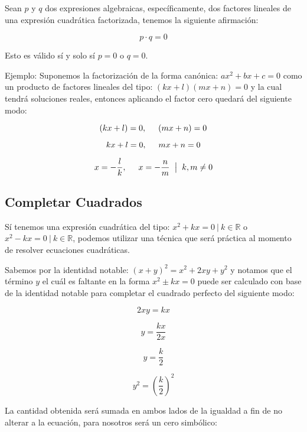 \documentclass[letterpaper, 10pt, oneside]{book}
\begin{document}
	\begin{tcolorbox}[title=Propiedad del Factor Cero]
		Sean $p$ y $q$ dos expresiones algebraicas, específicamente, dos factores lineales de una expresión cuadrática factorizada, tenemos la siguiente afirmación: 
		
		$$p\cdot q = 0$$
		
		Esto es válido sí y solo sí $p=0$ o $q=0$.
	\end{tcolorbox}
	
	\vspace{5mm}
	
	Ejemplo: Suponemos la factorización de la forma canónica: $ax^2+bx+c=0$ como un producto de factores lineales del tipo: $(kx+l)(mx+n)=0$ y la cual tendrá soluciones reales, entonces aplicando el factor cero quedará del siguiente modo:
	
	$$(kx+l)=0, \hspace{5mm} (mx+n)=0$$
	
	$$kx+l=0, \hspace{5mm} mx+n=0$$
	
	$$x=-\frac{l}{k}, \hspace{5mm} x=-\frac{n}{m} \hspace{2mm} \big| \hspace{2mm}  k, m \neq 0$$
	
	\subsection{Completar Cuadrados}
	
	Sí tenemos una expresión cuadrática del tipo: $x^2+kx=0 \ | \ k \in \mathbb{R}$ o $x^2-kx=0 \ | \ k \in \mathbb{R}$, podemos utilizar una técnica que será práctica al momento de resolver ecuaciones cuadráticas.\newline
	
	Sabemos por la identidad notable: $(x+y)^2=x^2+2xy+y^2$ y notamos que el término $y$ el cuál es faltante en la forma $x^2\pm kx=0$ puede ser calculado con base de la identidad notable para completar el cuadrado perfecto del siguiente modo:\newline
	
	$$2xy = kx$$
	
	$$y=\frac{kx}{2x}$$
	
	$$y=\frac{k}{2}$$
	
	$$y^2=\left(\frac{k}{2}\right)^2$$\newline
	
	La cantidad obtenida será sumada en ambos lados de la igualdad a fin de no alterar a la ecuación, para nosotros será un cero simbólico:\newline
	
\end{document}
